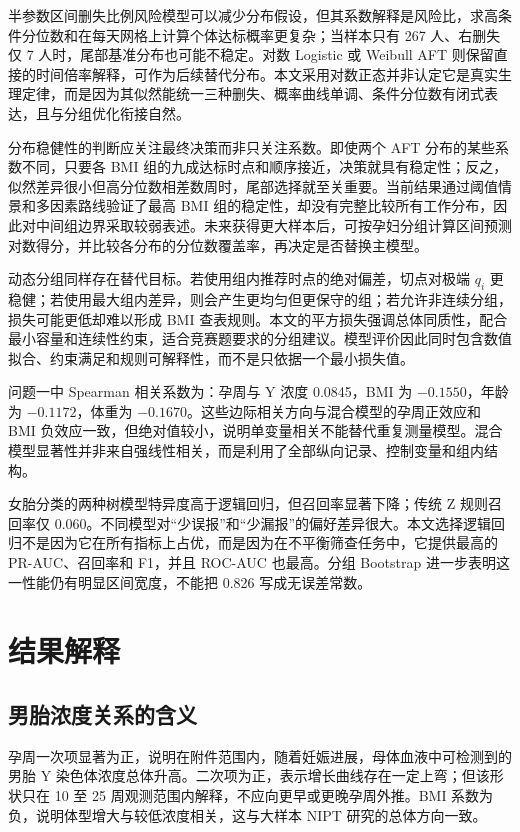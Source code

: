 \documentclass[UTF8,a4paper,12pt]{ctexart}
\begin{document}
半参数区间删失比例风险模型可以减少分布假设，但其系数解释是风险比，求高条件分位数和在每天网格上计算个体达标概率更复杂；当样本只有 267 人、右删失仅 7 人时，尾部基准分布也可能不稳定。对数 Logistic 或 Weibull AFT 则保留直接的时间倍率解释，可作为后续替代分布。本文采用对数正态并非认定它是真实生理定律，而是因为其似然能统一三种删失、概率曲线单调、条件分位数有闭式表达，且与分组优化衔接自然。

分布稳健性的判断应关注最终决策而非只关注系数。即使两个 AFT 分布的某些系数不同，只要各 BMI 组的九成达标时点和顺序接近，决策就具有稳定性；反之，似然差异很小但高分位数相差数周时，尾部选择就至关重要。当前结果通过阈值情景和多因素路线验证了最高 BMI 组的稳定性，却没有完整比较所有工作分布，因此对中间组边界采取较弱表述。未来获得更大样本后，可按孕妇分组计算区间预测对数得分，并比较各分布的分位数覆盖率，再决定是否替换主模型。

动态分组同样存在替代目标。若使用组内推荐时点的绝对偏差，切点对极端 $q_i$ 更稳健；若使用最大组内差异，则会产生更均匀但更保守的组；若允许非连续分组，损失可能更低却难以形成 BMI 查表规则。本文的平方损失强调总体同质性，配合最小容量和连续性约束，适合竞赛题要求的分组建议。模型评价因此同时包含数值拟合、约束满足和规则可解释性，而不是只依据一个最小损失值。

问题一中 Spearman 相关系数为：孕周与 Y 浓度 0.0845，BMI 为 $-0.1550$，年龄为 $-0.1172$，体重为 $-0.1670$。这些边际相关方向与混合模型的孕周正效应和 BMI 负效应一致，但绝对值较小，说明单变量相关不能替代重复测量模型。混合模型显著性并非来自强线性相关，而是利用了全部纵向记录、控制变量和组内结构。

女胎分类的两种树模型特异度高于逻辑回归，但召回率显著下降；传统 Z 规则召回率仅 0.060。不同模型对“少误报”和“少漏报”的偏好差异很大。本文选择逻辑回归不是因为它在所有指标上占优，而是因为在不平衡筛查任务中，它提供最高的 PR-AUC、召回率和 F1，并且 ROC-AUC 也最高。分组 Bootstrap 进一步表明这一性能仍有明显区间宽度，不能把 0.826 写成无误差常数。

\section{结果解释}

\subsection{男胎浓度关系的含义}

孕周一次项显著为正，说明在附件范围内，随着妊娠进展，母体血液中可检测到的男胎 Y 染色体浓度总体升高。二次项为正，表示增长曲线存在一定上弯；但该形状只在 10 至 25 周观测范围内解释，不应向更早或更晚孕周外推。BMI 系数为负，说明体型增大与较低浓度相关，这与大样本 NIPT 研究的总体方向一致\cite{deng,rolnik}。
\end{document}
